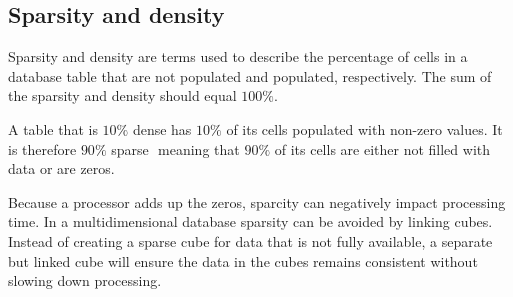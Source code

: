 \subsection{Sparsity and density}
Sparsity and density are terms used to describe the percentage of cells in a database table that are not populated and populated, respectively. The sum of the sparsity and density should equal $100\%$.

A table that is $10\%$ dense has $10\%$ of its cells populated with non-zero values. It is therefore $90\%$ sparse  meaning that $90\%$ of its cells are either not filled with data or are zeros.

Because a processor adds up the zeros, sparcity can negatively impact processing time. In a multidimensional database sparsity can be avoided by linking cubes. Instead of creating a sparse cube for data that is not fully available, a separate but linked cube will ensure
the data in the cubes remains consistent without slowing down processing.
